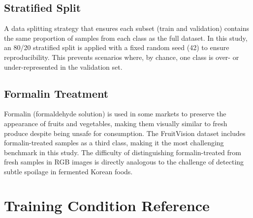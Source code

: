 \documentclass[12pt, a4paper]{article}
\begin{document}
\subsection{Stratified Split}

A data splitting strategy that ensures each subset (train and validation)
contains the same proportion of samples from each class as the full
dataset.
In this study, an 80/20 stratified split is applied with a fixed
random seed (42) to ensure reproducibility.
This prevents scenarios where, by chance, one class is over- or
under-represented in the validation set.

\subsection{Formalin Treatment}

Formalin (formaldehyde solution) is used in some markets to preserve
the appearance of fruits and vegetables, making them visually similar
to fresh produce despite being unsafe for consumption.
The FruitVision dataset includes formalin-treated samples as a
third class, making it the most challenging benchmark in this study.
The difficulty of distinguishing formalin-treated from fresh samples
in RGB images is directly analogous to the challenge of detecting
subtle spoilage in fermented Korean foods.

\section{Training Condition Reference}
\label{sec:conditions}
\end{document}
